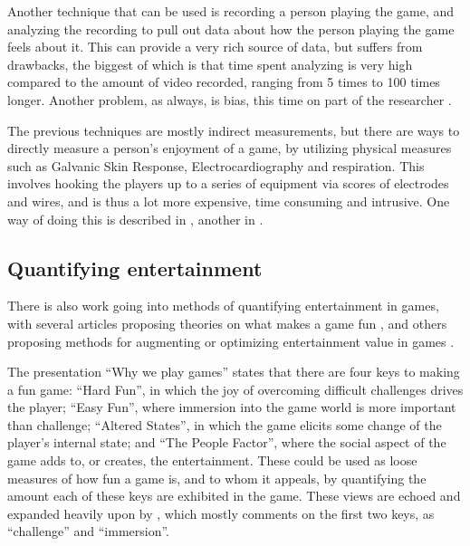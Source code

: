 \documentclass[]{report}
\begin{document}
Another technique that can be used is recording a person playing the game, and
analyzing the recording to pull out data about how the person playing the game
feels about it. This can provide a very rich source of data, but suffers from
drawbacks, the biggest of which is that time spent analyzing is very high
compared to the amount of video recorded, ranging from 5 times to 100 times
longer. Another problem, as always, is bias, this time on part of the
researcher \citep{mandryk2006using}.

The previous techniques are mostly indirect measurements, but there are ways to
directly measure a person's enjoyment of a game, by utilizing physical measures
such as Galvanic Skin Response, Electrocardiography and respiration. This
involves hooking the players up to a series of equipment via scores of
electrodes and wires, and is thus a lot more expensive, time consuming and
intrusive. One way of doing this is described in \citet{mandryk2006using},
another in \citet{yannakakis2008entertainment}.

\subsection{Quantifying entertainment}
\label{sec:quant-entert}

There is also work going into methods of quantifying entertainment in games,
with several articles proposing theories on what makes a game fun
\citep[e.g.][]{malone1981makes,read2002endurability,
federoff2002heuristics,lazzaro2004we,koster2004theory}, and others proposing methods for augmenting
or optimizing entertainment value in games
\citep[e.g.][]{yannakakis2009real,yannakakis2008model,yannakakis2007towards,yannakakis2004interactive}.

The presentation ``Why we play games'' \citep{lazzaro2004we} states that there
are four keys to making a fun game: ``Hard Fun'', in which the joy of overcoming
difficult challenges drives the player; ``Easy Fun'', where immersion into the
game world is more important than challenge; ``Altered States'', in which the
game elicits some change of the player's internal state; and ``The People
Factor'', where the social aspect of the game adds to, or creates, the
entertainment. These could be used as loose measures of how fun a game is, and
to whom it appeals, by quantifying the amount each of these keys are exhibited
in the game. These views are echoed and expanded heavily upon by
\citet{federoff2002heuristics}, which mostly comments on the first two keys, as
``challenge'' and ``immersion''.
\end{document}
